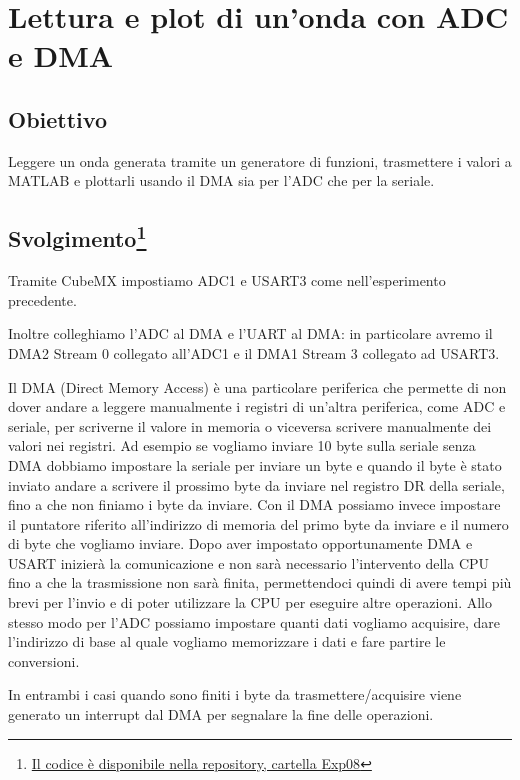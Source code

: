 \chapter{Lettura e plot di un'onda con ADC e DMA}

\section*{Obiettivo}
Leggere un onda generata tramite un generatore di funzioni, trasmettere i valori a MATLAB e plottarli usando il DMA sia per l'ADC che per la seriale.

\section*{Svolgimento\footnote{\href{https://github.com/fdila/electronics-experimentation/tree/main/Exp08}{Il codice è disponibile nella repository, cartella Exp08}}}

Tramite CubeMX impostiamo ADC1 e USART3 come nell'esperimento precedente.

Inoltre colleghiamo l'ADC al DMA e l'UART al DMA: in particolare avremo il DMA2 Stream 0 collegato all'ADC1 e il DMA1 Stream 3 collegato ad USART3.

Il DMA (Direct Memory Access) è una particolare periferica che permette di non dover andare a leggere manualmente i registri di un'altra periferica, come ADC e seriale, per scriverne il valore in memoria o viceversa scrivere manualmente dei valori nei registri.
Ad esempio se vogliamo inviare 10 byte sulla seriale senza DMA dobbiamo impostare la seriale per inviare un byte e quando il byte è stato inviato andare a scrivere il prossimo byte da inviare nel registro DR della seriale, fino a che non finiamo i byte da inviare.
Con il DMA possiamo invece impostare il puntatore riferito all'indirizzo di memoria del primo byte da inviare e il numero di byte che vogliamo inviare. Dopo aver impostato opportunamente DMA e USART inizierà la comunicazione e non sarà necessario l'intervento della CPU fino a che la trasmissione non sarà finita, permettendoci quindi di avere tempi più brevi per l'invio e di poter utilizzare la CPU per eseguire altre operazioni.
Allo stesso modo per l'ADC possiamo impostare quanti dati vogliamo acquisire, dare l'indirizzo di base al quale vogliamo memorizzare i dati e fare partire le conversioni.

In entrambi i casi quando sono finiti i byte da trasmettere/acquisire viene generato un interrupt dal DMA per segnalare la fine delle operazioni.

